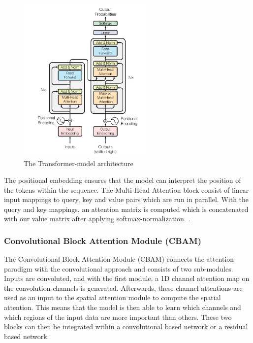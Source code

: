 \begin{figure}[H]
    \centering
    \includegraphics[width=0.6\textwidth]{Figures/Transformer.png}
    \caption{The Transformer-model architecture \cite{vaswani_attention_2023}}
    \label{fig:transformer_model}
\end{figure}

The positional embedding ensures that the model can interpret the position of the tokens within the sequence. The Multi-Head Attention block consist of linear input mappings to query, key and value pairs which are run in parallel. With the query and key mappings, an attention matrix is computed which is concatenated with our value matrix after applying softmax-normalization.  \cite{vaswani_attention_2023}. 

\subsubsection{Convolutional Block Attention Module (CBAM)}
The Convolutional Block Attention Module (CBAM) connects the attention paradigm with the convolutional approach and consists of two sub-modules. Inputs are convoluted, and with the first module, a 1D channel attention map on the convolution-channels is generated. Afterwards, these channel attentions are used as an input to the spatial attention module to compute the spatial attention. This means that the model is then able to learn which channels and which regions of the input data are more important than others. These two blocks can then be integrated within a convolutional based network or a residual based network.

